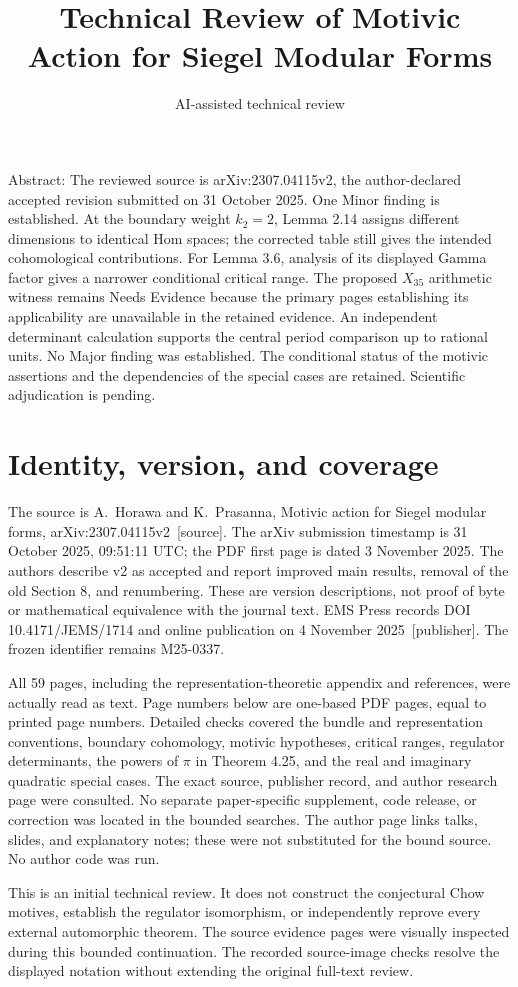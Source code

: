 \documentclass[10pt]{article}
\title{Technical Review of
Motivic Action for Siegel Modular Forms}
\author{AI-assisted technical review}
\date{}
\begin{document}
\maketitle
Abstract: The reviewed source is arXiv:2307.04115v2, the author-declared accepted revision submitted on 31 October 2025. One Minor finding is established. At the boundary weight \(k_2=2\), Lemma 2.14 assigns different dimensions to identical Hom spaces; the corrected table still gives the intended cohomological contributions. For Lemma 3.6, analysis of its displayed Gamma factor gives a narrower conditional critical range. The proposed \(X_{35}\) arithmetic witness remains Needs Evidence because the primary pages establishing its applicability are unavailable in the retained evidence. An independent determinant calculation supports the central period comparison up to rational units. No Major finding was established. The conditional status of the motivic assertions and the dependencies of the special cases are retained. Scientific adjudication is pending.\par
\section*{Identity, version, and coverage}
The source is A. Horawa and K. Prasanna, Motivic action for Siegel modular forms, arXiv:2307.04115v2 [source]. The arXiv submission timestamp is 31 October 2025, 09:51:11 UTC; the PDF first page is dated 3 November 2025. The authors describe v2 as accepted and report improved main results, removal of the old Section 8, and renumbering. These are version descriptions, not proof of byte or mathematical equivalence with the journal text. EMS Press records DOI 10.4171/JEMS/1714 and online publication on 4 November 2025 [publisher]. The frozen identifier remains M25-0337.\par
All 59 pages, including the representation-theoretic appendix and references, were actually read as text. Page numbers below are one-based PDF pages, equal to printed page numbers. Detailed checks covered the bundle and representation conventions, boundary cohomology, motivic hypotheses, critical ranges, regulator determinants, the powers of \(\pi\) in Theorem 4.25, and the real and imaginary quadratic special cases. The exact source, publisher record, and author research page were consulted. No separate paper-specific supplement, code release, or correction was located in the bounded searches. The author page links talks, slides, and explanatory notes; these were not substituted for the bound source. No author code was run.\par
This is an initial technical review. It does not construct the conjectural Chow motives, establish the regulator isomorphism, or independently reprove every external automorphic theorem. The source evidence pages were visually inspected during this bounded continuation. The recorded source-image checks resolve the displayed notation without extending the original full-text review.\par
\end{document}
